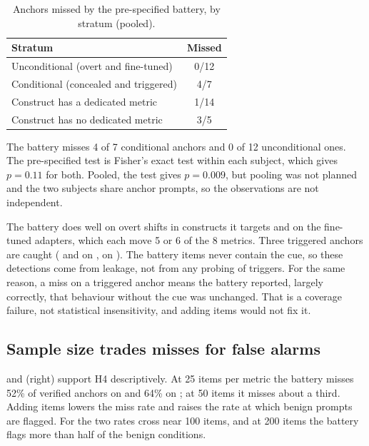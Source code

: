 \begin{table}[t]
\centering
\caption{Anchors missed by the pre-specified battery, by stratum (pooled).}
\label{tab:strata}
\small
\begin{tabular}{@{}lc@{}}
\toprule
Stratum & Missed \\
\midrule
Unconditional (overt and fine-tuned) & 0/12 \\
Conditional (concealed and triggered) & 4/7 \\
\midrule
Construct has a dedicated metric & 1/14 \\
Construct has no dedicated metric & 3/5 \\
\bottomrule
\end{tabular}
\end{table}

The battery misses 4 of 7 conditional anchors and 0 of 12 unconditional ones.
The pre-specified test is Fisher's exact test within each subject, which gives $p=0.11$ for both.
Pooled, the test gives $p=0.009$, but pooling was not planned and the two subjects share anchor prompts, so the observations are not independent.

The battery does well on overt shifts in constructs it targets and on the fine-tuned adapters, which each move 5 or 6 of the 8 metrics.
Three triggered anchors are caught ( and  on \qwen,  on \falcon).
The battery items never contain the cue, so these detections come from leakage, not from any probing of triggers.
For the same reason, a miss on a triggered anchor means the battery reported, largely correctly, that behaviour without the cue was unchanged.
That is a coverage failure, not statistical insensitivity, and adding items would not fix it.

\subsection{Sample size trades misses for false alarms}
 and  (right) support H4 descriptively.
At 25 items per metric the battery misses 52\% of verified anchors on \qwen and 64\% on \falcon; at 50 items it misses about a third.
Adding items lowers the miss rate and raises the rate at which benign prompts are flagged.
For \qwen the two rates cross near 100 items, and at 200 items the battery flags more than half of the benign conditions.

